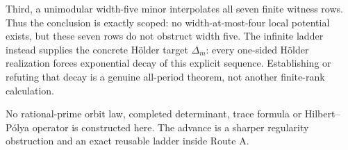 Third, a unimodular width-five minor interpolates all seven finite witness
rows.  Thus the conclusion is exactly scoped: no width-at-most-four local
potential exists, but these seven rows do not obstruct width five.  The
infinite ladder instead supplies the concrete H\"older target
\(\Delta_m\): every one-sided H\"older realization forces exponential
decay of this explicit sequence.  Establishing or refuting that decay is a
genuine all-period theorem, not another finite-rank calculation.

No rational-prime orbit law, completed determinant, trace formula or
Hilbert--P\'olya operator is constructed here.  The advance is a sharper
regularity obstruction and an exact reusable ladder inside Route A.

